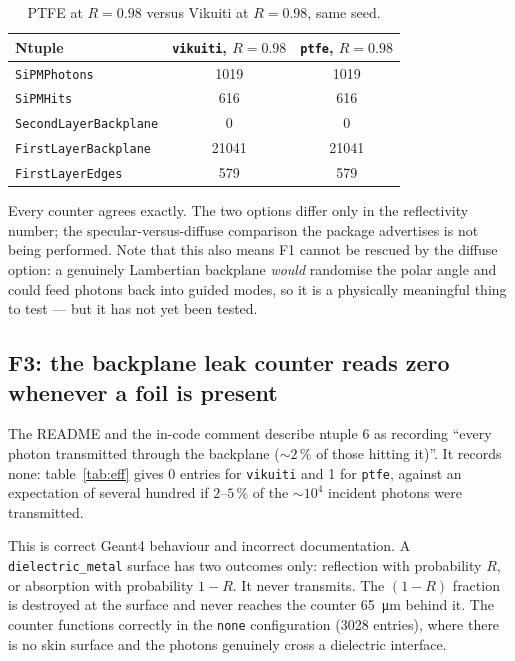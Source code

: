 \documentclass[a4paper,11pt]{article}
\begin{document}
\begin{table}[htbp]
\centering
\caption{\label{tab:ptfe}PTFE at $R=0.98$ versus Vikuiti at $R=0.98$, same seed.}
\begin{tabular}{lcc}
\toprule
Ntuple & \texttt{vikuiti}, $R=0.98$ & \texttt{ptfe}, $R=0.98$ \\
\midrule
\texttt{SiPMPhotons}          & 1019  & 1019 \\
\texttt{SiPMHits}             & 616   & 616 \\
\texttt{SecondLayerBackplane} & 0     & 0 \\
\texttt{FirstLayerBackplane}  & 21041 & 21041 \\
\texttt{FirstLayerEdges}      & 579   & 579 \\
\bottomrule
\end{tabular}
\end{table}

Every counter agrees exactly. The two options differ only in the reflectivity
number; the specular-versus-diffuse comparison the package advertises is not
being performed. Note that this also means F1 cannot be rescued by the diffuse
option: a genuinely Lambertian backplane \emph{would} randomise the polar angle
and could feed photons back into guided modes, so it is a physically meaningful
thing to test --- but it has not yet been tested.

\subsection{F3: the backplane leak counter reads zero whenever a foil is present}
\label{sec:f3}

The README and the in-code comment describe ntuple 6 as recording ``every photon
transmitted through the backplane ($\sim2\,\%$ of those hitting it)''. It records
none: table~\ref{tab:eff} gives 0 entries for \texttt{vikuiti} and 1 for
\texttt{ptfe}, against an expectation of several hundred if $2$--$5\,\%$ of the
$\sim10^{4}$ incident photons were transmitted.

This is correct Geant4 behaviour and incorrect documentation. A
\texttt{dielectric\_metal} surface has two outcomes only: reflection with
probability $R$, or absorption with probability $1-R$. It never transmits. The
$(1-R)$ fraction is destroyed at the surface and never reaches the counter
\SI{65}{\micro\meter} behind it. The counter functions correctly in the
\texttt{none} configuration (3028 entries), where there is no skin surface and
the photons genuinely cross a dielectric interface.
\end{document}
